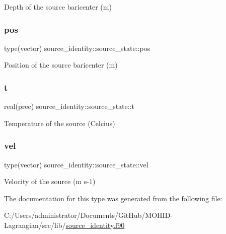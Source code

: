 Depth of the source baricenter (m) 

\mbox{\label{structsource__identity_1_1source__state_a070917562792ada99bdb2eaa2b5274e8}} 
\subsubsection{\texorpdfstring{pos}{pos}}
{\footnotesize\ttfamily type(vector) source\+\_\+identity\+::source\+\_\+state\+::pos\hspace{0.3cm}{\ttfamily [private]}}



Position of the source baricenter (m) 

\mbox{\label{structsource__identity_1_1source__state_ac370880f81e096a7aabb9fca144143fb}} 
\subsubsection{\texorpdfstring{t}{t}}
{\footnotesize\ttfamily real(prec) source\+\_\+identity\+::source\+\_\+state\+::t\hspace{0.3cm}{\ttfamily [private]}}



Temperature of the source (Celcius) 

\mbox{\label{structsource__identity_1_1source__state_aea32db0332ef565f04ab210f5b17dba1}} 
\subsubsection{\texorpdfstring{vel}{vel}}
{\footnotesize\ttfamily type(vector) source\+\_\+identity\+::source\+\_\+state\+::vel\hspace{0.3cm}{\ttfamily [private]}}



Velocity of the source (m s-\/1) 



The documentation for this type was generated from the following file\+:\begin{DoxyCompactItemize}
\item 
C\+:/\+Users/administrator/\+Documents/\+Git\+Hub/\+M\+O\+H\+I\+D-\/\+Lagrangian/src/lib/\mbox{\hyperlink{source__identity_8f90}{source\+\_\+identity.\+f90}}\end{DoxyCompactItemize}

